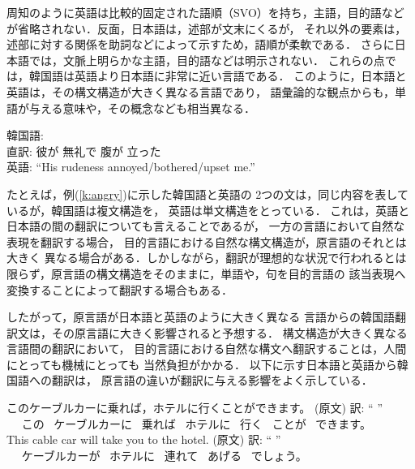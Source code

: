 周知のように英語は比較的固定された語順（SVO）を持ち，主語，目的語など
が省略されない．反面，日本語は，述部が文末にくるが，
それ以外の要素は，
述部に対する関係を助詞などによって示すため，語順が柔軟である．
さらに日本語では，文脈上明らかな主語，目的語などは明示されない．
これらの点では，韓国語は英語より日本語に非常に近い言語である．
このように，日本語と英語は，その構文構造が大きく異なる言語であり，
語彙論的な観点からも，単語が与える意味や，その概念なども相当異なる．

 \begin{exe}
  \ex\label{k:angry} 
  \gll 韓国語:  ~  \\
  直訳: 彼が 無礼で 腹が 立った\\
  \trans  英語: ``His rudeness annoyed/bothered/upset me.''
\end{exe} 

たとえば，例(\ref{k:angry})に示した韓国語と英語の
2つの文\cite{Lee:1999}は，同じ内容を表しているが，韓国語は複文構造を，
英語は単文構造をとっている．
これは，英語と日本語の間の翻訳についても言えることであるが，
一方の言語において自然な表現を翻訳する場合，
目的言語における自然な構文構造が，原言語のそれとは大きく
異なる場合がある．しかしながら，翻訳が理想的な状況で行われるとは
限らず，原言語の構文構造をそのままに，単語や，句を目的言語の
該当表現へ変換することによって翻訳する場合もある．

したがって，原言語が日本語と英語のように大きく異なる
言語からの韓国語翻訳文は，その原言語に大きく影響されると予想する．
構文構造が大きく異なる言語間の翻訳において，
目的言語における自然な構文へ翻訳することは，人間にとっても機械にとっても
当然負担がかかる．
以下に示す日本語と英語から韓国語への翻訳は，
原言語の違いが翻訳に与える影響をよく示している．

\begin{exe}
 \ex 
\begin{xlist}
 \ex \label{sj_1} このケーブルカーに乗れば，ホテルに行くことができます。
 (原文)
 \trans \gll 訳: ``   
     ''\\
　 この~ ケーブルカーに~ 乗れば~ ホテルに~ 行く~  ことが~ できます。\\

 \ex \label{se_1} This cable car will take you to the hotel. (原文)
 \trans \gll 訳: ``   
   ''\\
　 ケーブルカーが~ ホテルに~ 連れて~ あげる~ でしょう。\\
\end{xlist}
\end{exe}

